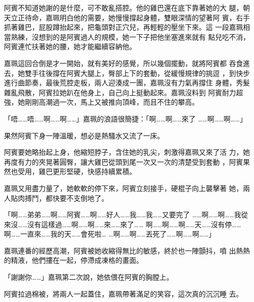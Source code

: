 阿賓不知道她謝的是什麼，可不敢亂搭腔。他的雞巴還在底下靠著她的大
腿，朝天立正待命，嘉珮明白他的需要，她慢慢撐起身體，雙眼深情的望著阿
賓，右手抓著雞巴，屁股蹲抬起來，把龜頭對正穴兒，再輕輕的壓坐下來。這
一段嘉珮相當熟練，沒想到的是阿賓過人的規模，她一下子把他坐塞進來就有
點兒吃不消，阿賓連忙扶著她的腰，她才能繼續容納他。

嘉珮這回合倒是才一開始，就有美好的感覺，所以幾個擺動，就將阿賓都
吞食進去，她雙手往後撐在阿賓大腿上，臀部上下的套動，從緩慢規律的挑逗
，到快步進行曲節奏，最後荒腔走板，兩人迎湊成一團，嘉珮沒有力氣再撐住
身體，秀髮雜亂飛散，阿賓拉她趴在他身上，自己向上挺動起來。嘉珮沒料到
阿賓耐力超強，她剛剛高潮過一次，馬上又被推向頂峰，而且不住的攀高。

「唔……唔……啊……啊……」嘉珮的浪語很簡捷：「啊……啊……來了
……啊……啊……」

果然阿賓下身一陣溫暖，想必是熱騷水又流了一床。

阿賓要她略抬起上身，他縮短脖子，含住她的乳尖，刺激得嘉珮又來了活
力，她再度有力的夾晃著圓臀，讓大雞巴從頭到尾一次又一次的清楚受到套動
，阿賓果然也受用，雞巴更形堅硬，快感持續累積。

嘉珮又用盡力量了，她軟軟的停下來，阿賓立刻接手，硬棍子向上襲擊著
她，兩人貼肉搏鬥，都快要不支倒地了。

「啊……弟弟……啊……阿賓……啊……好人……我……我……又要完了
……啊……啊……我從來沒……沒有這樣過……啊……啊……來……來了……
啊……啊……啊……天……沒有停……啊……一直來……我的天……會死啦…
…啊……啊……丟死了……啊……啊……」

嘉珮連番的經歷高潮，阿賓被她收縮得無比的敏感，終於也一陣顫抖，噴
出熱熱的精液，他們摟在一起，停滯成凍格的畫面。

「謝謝你……」嘉珮第二次說，她依偎在阿賓的胸膛上。

阿賓拉過棉被，將兩人一起蓋住，嘉珮帶著滿足的笑容，這次真的沉沉睡
去。










